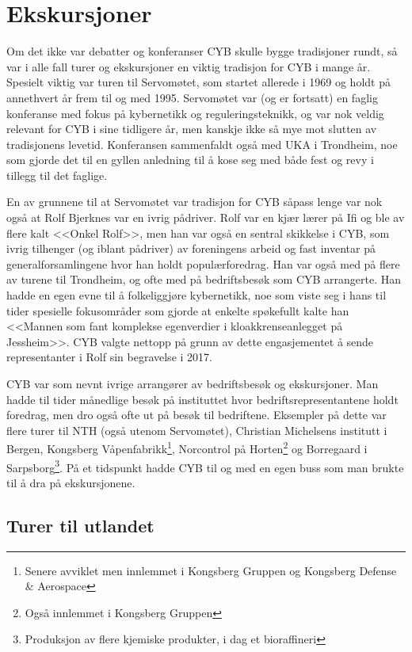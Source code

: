 \section{Ekskursjoner}

Om det ikke var debatter og konferanser CYB skulle bygge tradisjoner rundt, så var i alle fall turer og ekskursjoner en viktig tradisjon for CYB i mange år. Spesielt viktig var turen til Servomøtet, som startet allerede i 1969 og holdt på annethvert år frem til og med 1995. Servomøtet var (og er fortsatt) en faglig konferanse med fokus på kybernetikk og reguleringsteknikk, og var nok veldig relevant for CYB i sine tidligere år, men kanskje ikke så mye mot slutten av tradisjonens levetid. Konferansen sammenfaldt også med UKA i Trondheim, noe som gjorde det til en gyllen anledning til å kose seg med både fest og revy i tillegg til det faglige.

En av grunnene til at Servomøtet var tradisjon for CYB såpass lenge var nok også at Rolf Bjerknes var en ivrig pådriver. Rolf var en kjær lærer på Ifi og ble av flere kalt <<Onkel Rolf>>, men han var også en sentral skikkelse i CYB, som ivrig tilhenger (og iblant pådriver) av foreningens arbeid og fast inventar på generalforsamlingene hvor han holdt populærforedrag. Han var også med på flere av turene til Trondheim, og ofte med på bedriftsbesøk som CYB arrangerte. Han hadde en egen evne til å folkeliggjøre kybernetikk, noe som viste seg i hans til tider spesielle fokusområder som gjorde at enkelte spøkefullt kalte han <<Mannen som fant komplekse egenverdier i kloakkrenseanlegget på Jessheim>>. CYB valgte nettopp på grunn av dette engasjementet å sende representanter i Rolf sin begravelse i 2017.

CYB var som nevnt ivrige arrangører av bedriftsbesøk og ekskursjoner. Man hadde til tider månedlige besøk på instituttet hvor bedriftsrepresentantene holdt foredrag, men dro også ofte ut på besøk til bedriftene. Eksempler på dette var flere turer til NTH (også utenom Servomøtet), Christian Michelsens institutt i Bergen, Kongsberg Våpenfabrikk\footnote{Senere avviklet men innlemmet i Kongsberg Gruppen og Kongsberg Defense \& Aerospace}, Norcontrol på Horten\footnote{Også innlemmet i Kongsberg Gruppen} og Borregaard i Sarpsborg\footnote{Produksjon av flere kjemiske produkter, i dag et bioraffineri}. På et tidspunkt hadde CYB til og med en egen buss som man brukte til å dra på ekskursjonene.

\subsection{Turer til utlandet}

